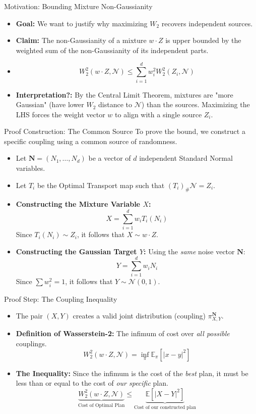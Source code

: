 \documentclass{beamer}
\begin{document}
\begin{frame}{Motivation: Bounding Mixture Non-Gaussianity}
  \begin{itemize}
    \item \textbf{Goal:} We want to justify why maximizing $W_2$ recovers independent sources.
    \item \textbf{Claim:} The non-Gaussianity of a mixture $w \cdot Z$ is upper bounded by the weighted sum of the non-Gaussianity of its independent parts.
    \item 
      \[
        W_2^2(w \cdot Z, \mathcal{N}) \le \sum_{i=1}^{d} w_i^2 W_2^2(Z_i, \mathcal{N})
      \]
    \item \textbf{Interpretation?:} By the Central Limit Theorem, mixtures are "more Gaussian" (have lower $W_2$ distance to $\mathcal{N}$) than the sources. Maximizing the LHS forces the weight vector $w$ to align with a single source $Z_i$.
  \end{itemize}
\end{frame}

\begin{frame}{Proof Construction: The Common Source}
  To prove the bound, we construct a specific coupling using a common source of randomness.
  \begin{itemize}
    \item Let $\mathbf{N} = (N_1, \dots, N_d)$ be a vector of $d$ independent Standard Normal variables.
    \item Let $T_i$ be the Optimal Transport map such that $(T_i)_{\#} \mathcal{N} = Z_i$.
    \item \textbf{Constructing the Mixture Variable $X$:}
      \[
        X = \sum_{i=1}^d w_i T_i(N_i)
      \]
      Since $T_i(N_i) \sim Z_i$, it follows that $X \sim w \cdot Z$.
    \item \textbf{Constructing the Gaussian Target $Y$:}
      Using the \textit{same} noise vector $\mathbf{N}$:
      \[
        Y = \sum_{i=1}^d w_i N_i
      \]
      Since $\sum w_i^2 = 1$, it follows that $Y \sim \mathcal{N}(0,1)$.
  \end{itemize}
\end{frame}

\begin{frame}{Proof Step: The Coupling Inequality}
  \begin{itemize}
    \item The pair $(X, Y)$ creates a valid joint distribution (coupling) $\pi_{X,Y}^{\mathbf{N}}$.
    \item \textbf{Definition of Wasserstein-2:} The infimum of cost over \textit{all possible} couplings.
      \[
        W_2^2(w \cdot Z, \mathcal{N}) = \inf_{\pi} \mathbb{E}_{\pi}[|x - y|^2]
      \]
    \item \textbf{The Inequality:} Since the infimum is the cost of the \textit{best} plan, it must be less than or equal to the cost of \textit{our specific} plan.
      \[
        \underbrace{W_2^2(w \cdot Z, \mathcal{N})}_{\text{Cost of Optimal Plan}} \le \underbrace{\mathbb{E}[|X - Y|^2]}_{\text{Cost of our constructed plan}}
      \]
  \end{itemize}
\end{frame}
\end{document}
